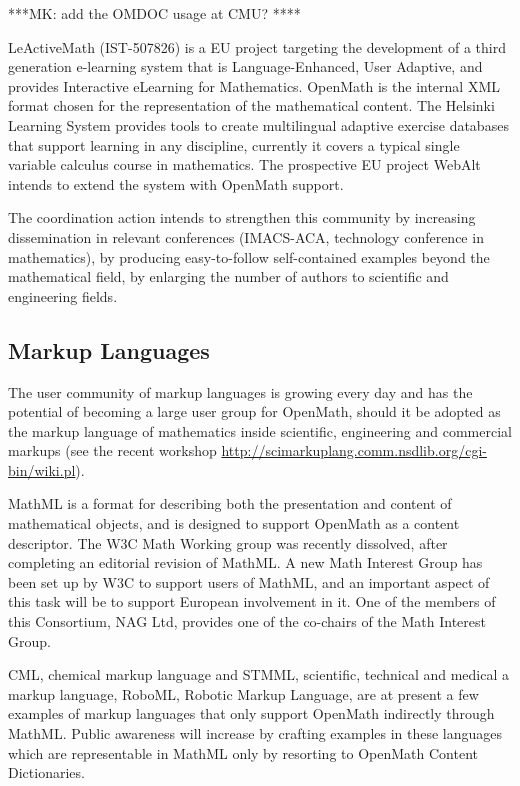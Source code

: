 \documentclass{euproposal}
\begin{document}
***MK: add the OMDOC usage at CMU? ****

LeActiveMath (IST-507826) is a EU project targeting the development of
a third generation e-learning system that is Language-Enhanced, User
Adaptive, and provides Interactive eLearning for Mathematics. OpenMath
is the internal XML format chosen for the representation of the
mathematical content.  The Helsinki Learning System provides tools to
create multilingual adaptive exercise databases that support learning
in any discipline, currently it covers a typical single variable
calculus course in mathematics. The prospective EU project WebAlt
intends to extend the system with OpenMath support.


The coordination action intends to strengthen this community by
increasing dissemination in relevant conferences (IMACS-ACA,
technology conference in mathematics), by producing easy-to-follow
self-contained examples beyond the mathematical field, by enlarging
the number of authors to scientific and engineering fields.


\subsection{Markup Languages}
\label{sec:ml}

The user community of markup languages is growing every day and has
the potential of becoming a large user group for OpenMath, should it
be adopted as the markup language of mathematics inside scientific,
engineering and commercial markups (see the recent workshop
\url{http://scimarkuplang.comm.nsdlib.org/cgi-bin/wiki.pl}).

MathML is a format for describing both the presentation and content of
mathematical objects, and is designed to support OpenMath as a content
descriptor.  The W3C Math Working group was recently dissolved, after
completing an editorial revision of MathML.  A new Math Interest Group
has been set up by W3C to support users of MathML, and an important
aspect of this task will be to support European involvement in it.
One of the members of this Consortium, NAG Ltd, provides one of the
co-chairs of the Math Interest Group.

CML, chemical markup language and STMML, scientific, technical and
medical a markup language, RoboML, Robotic Markup Language, are at
present a few examples of markup languages that only support OpenMath
indirectly through MathML.  Public awareness will increase by crafting
examples in these languages which are representable in MathML only by
resorting to OpenMath Content Dictionaries.
\end{document}
